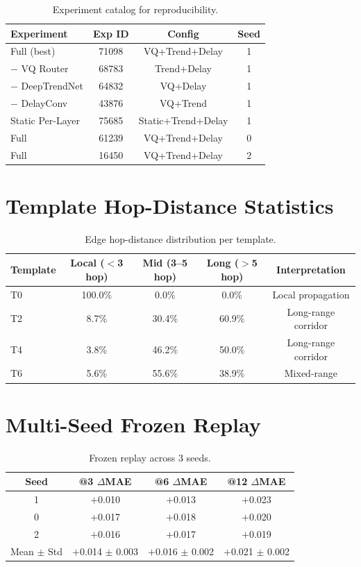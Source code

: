 \documentclass[journal]{IEEEtran}
\begin{document}
\begin{table}[h]
\centering
\caption{Experiment catalog for reproducibility.}
\begin{tabular}{lccc}
\toprule
Experiment & Exp ID & Config & Seed \\
\midrule
Full (best) & 71098 & VQ+Trend+Delay & 1 \\
$-$ VQ Router & 68783 & Trend+Delay & 1 \\
$-$ DeepTrendNet & 64832 & VQ+Delay & 1 \\
$-$ DelayConv & 43876 & VQ+Trend & 1 \\
Static Per-Layer & 75685 & Static+Trend+Delay & 1 \\
Full & 61239 & VQ+Trend+Delay & 0 \\
Full & 16450 & VQ+Trend+Delay & 2 \\
\bottomrule
\end{tabular}
\end{table}

\section{Template Hop-Distance Statistics}

\begin{table}[h]
\centering
\caption{Edge hop-distance distribution per template.}
\begin{tabular}{lcccc}
\toprule
Template & Local ($<$3 hop) & Mid (3--5 hop) & Long ($>$5 hop) & Interpretation \\
\midrule
T0 & 100.0\% & 0.0\% & 0.0\% & Local propagation \\
T2 & 8.7\% & 30.4\% & 60.9\% & Long-range corridor \\
T4 & 3.8\% & 46.2\% & 50.0\% & Long-range corridor \\
T6 & 5.6\% & 55.6\% & 38.9\% & Mixed-range \\
\bottomrule
\end{tabular}
\end{table}

\section{Multi-Seed Frozen Replay}

\begin{table}[h]
\centering
\caption{Frozen replay across 3 seeds.}
\begin{tabular}{cccc}
\toprule
Seed & @3 $\Delta$MAE & @6 $\Delta$MAE & @12 $\Delta$MAE \\
\midrule
1 & $+$0.010 & $+$0.013 & $+$0.023 \\
0 & $+$0.017 & $+$0.018 & $+$0.020 \\
2 & $+$0.016 & $+$0.017 & $+$0.019 \\
\midrule
Mean $\pm$ Std & $+$0.014 $\pm$ 0.003 & $+$0.016 $\pm$ 0.002 & $+$0.021 $\pm$ 0.002 \\
\bottomrule
\end{tabular}
\end{table}
\end{document}
